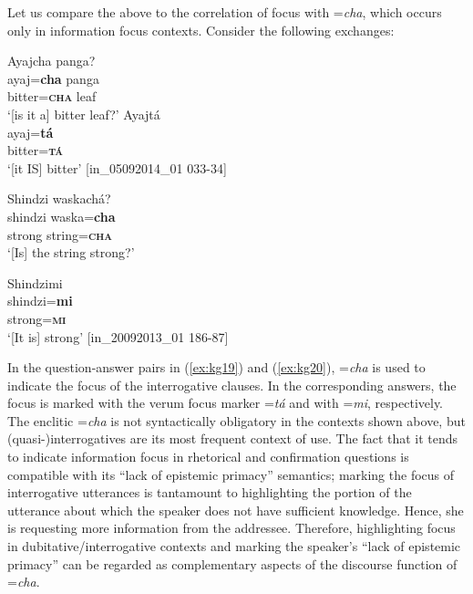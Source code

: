 \documentclass[output=paper]{langscibook}
\begin{document}
Let us compare the above to the correlation of focus with =\textit{cha}, which occurs only in information focus contexts. Consider the following exchanges:


\begin{exe}
	\ex \label{ex:kg19}
	\begin{xlist}
		\ex \label{ex:kg19a}
		\glll Ayajcha panga?\\
		ayaj=\textbf{cha} panga\\
		bitter=\textbf{\textsc{cha}}   leaf\\
		\trans ‘[is it a] bitter leaf?’
		\ex  \label{ex:kg19b}
		\glll Ayajtá\\
		ayaj=\textbf{tá}\\
        bitter=\textbf{\textsc{tá}}\\
        \trans ‘[it IS]  bitter’ [in\_05092014\_01   033-34]
	\end{xlist}
\end{exe}

\begin{exe}
	\ex \label{ex:kg20}
	\begin{xlist}
		\ex \label{ex:kg20a}
		\glll Shindzi waskachá?\\
		shindzi waska=\textbf{cha}\\
		strong	string=\textbf{\textsc{cha}}\\
		\trans ‘[Is] the string strong?’
		
		\ex  \label{ex:kg20b}
		\glll Shindzimi\\
		shindzi=\textbf{mi}\\
        strong=\textbf{\textsc{mi}}\\
        \trans ‘[It is] strong’ [in\_20092013\_01    186-87]
	\end{xlist}
\end{exe}

In the question-answer pairs in (\ref{ex:kg19}) and (\ref{ex:kg20}), =\textit{cha} is used to indicate the focus of the interrogative clauses. In the corresponding answers, the focus is marked with the verum focus marker =\textit{tá} and with =\textit{mi}, respectively. The enclitic =\textit{cha} is not syntactically obligatory in the contexts shown above, but (quasi-)interrogatives are its most frequent context of use. The fact that it tends to indicate information focus in rhetorical and confirmation questions is compatible with its “lack of epistemic primacy” semantics; marking the focus of interrogative utterances is tantamount to highlighting the portion of the utterance about which the speaker does not have sufficient knowledge. Hence, she is requesting more information from the addressee. Therefore, highlighting focus in dubitative/interrogative contexts and marking the speaker’s “lack of epistemic primacy” can be regarded as complementary aspects of the discourse function of =\textit{cha}.
\end{document}

